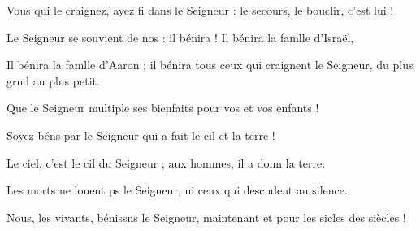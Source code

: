 \item Vous qui le craignez, ayez fi dans le Seigneur :\psstar{} le secours, le bouclir, c’est lui !
\item Le Seigneur se souvient de nos : il bénira !\psstar{} Il bénira la famlle d’Israël, 
\item Il bénira la famlle d’Aaron ;\psstar{} il bénira tous ceux qui craignent le Seigneur, du plus grnd au plus petit.
\item Que le Seigneur multiple ses bienfaits\psstar{} pour vos et vos enfants !
\item Soyez béns par le Seigneur\psstar{} qui a fait le cil et la terre !
\item Le ciel, c’est le cil du Seigneur ;\psstar{} aux hommes, il a donn la terre.
\item Les morts ne louent ps le Seigneur,\psstar{} ni ceux qui descndent au silence.
\item Nous, les vivants, bénissns le Seigneur,\psstar{} maintenant et pour les sicles des siècles !